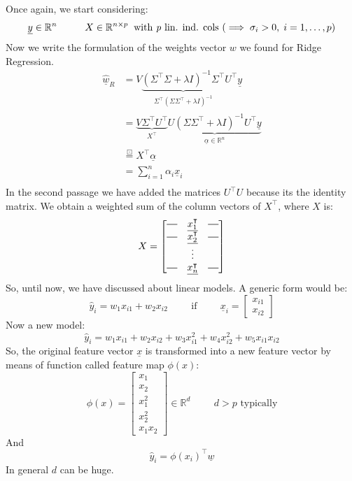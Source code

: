 \vspace{2cm}
Once again, we start considering:
\[
    \underline{y} \in \mathbb{R}^n \hspace{1cm} X \in \mathbb{R}^{n \times p} \hspace{0.2cm} \text{with \emph{p} lin. ind. cols } (\implies \sigma_i > 0, \hspace{0.1cm} i = 1, \dots, p)  
\]
Now we write the formulation of the weights vector $w$ we found for Ridge Regression. 
\[
    \begin{split}
    \underline{\hat{w}}_R &= V\underbrace{(\Sigma^\intercal \Sigma + \lambda I)^{-1} \Sigma^\intercal}_{\substack{\Sigma^\intercal(\Sigma \Sigma^\intercal + \lambda I)^{-1}}} U^\intercal \underline{y}\\
    &= \underbrace{V\Sigma^\intercal U^\intercal}_{X^\intercal} \underbrace{U(\Sigma \Sigma^\intercal + \lambda I)^{-1} U^\intercal \underline{y}}_{\underline{\alpha} \in \mathbb{R}^n}\\
    &\overset{\boxdot}{=} X^\intercal \underline{\alpha}\\
    &= \sum_{i=1}^n \alpha_i \underline{x}_i\\
    \end{split}     
\]
In the second passage we have added the matrices $U^\intercal U$ because its the identity matrix. We obtain a weighted sum of the column vectors of $X^\intercal$, where $X$ is:
\[
X = \begin{bmatrix}
    \horzbar & \underline{x_1^\intercal} & \horzbar\\
    \horzbar & \underline{x_2^\intercal} & \horzbar\\    
     & \vdots & \\
    \horzbar & \underline{x_n^\intercal} & \horzbar
\end{bmatrix}
\]
So, until now, we have discussed about linear models. A generic form would be:
\[
    \hat{y}_i = w_1x_{i1} + w_2x_{i2} \hspace{1cm} \text{if} \hspace{1cm} \underline{x}_i = \begin{bmatrix}
        x_{i1}\\
        x_{i2}
    \end{bmatrix}    
\]
Now a new model:
\[
    \hat{y}_i = w_1x_{i1} + w_2x_{i2} + w_3x_{i1}^2 + w_4x_{i2}^2 + w_5x_{i1}x_{i2}    
\]
So, the original feature vector $\underline{x}$ is transformed into a new feature vector by means of function called feature map $\phi(x)$:
\[
    \phi(x) = \begin{bmatrix}
        x_1\\
        x_2\\
        x_1^2\\
        x_2^2\\
        x_1x_2
    \end{bmatrix} \in \mathbb{R}^d \hspace{1cm} d > p \text{ typically}    
\]
And
\[
    \hat{y}_i = \phi(x_i)^\intercal \underline{w}    
\]
In general $d$ can be huge.


